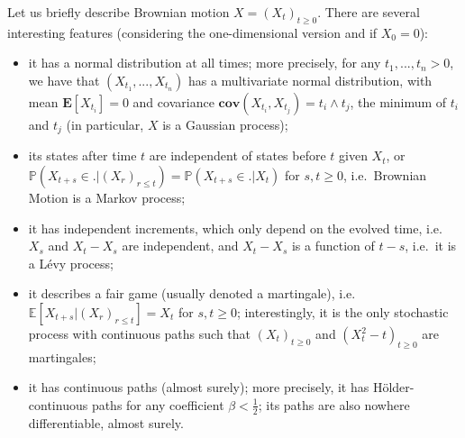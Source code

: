 \documentclass[lean]{Draft}
\begin{document}
Let us briefly describe Brownian motion $X = (X_t)_{t\geq 0}$. There are several interesting features (considering the one-dimensional version and if $X_0=0$):
\begin{itemize}
\item it has a normal distribution at all times; more precisely, for any $t_1,...,t_n > 0$, we have that $(X_{t_1},...,X_{t_n})$ has a multivariate normal distribution, with mean $\mathbf E[X_{t_i}] = 0$ and covariance $\mathbf{cov}(X_{t_i}, X_{t_j}) = t_i \wedge t_j$, the minimum of $t_i$ and $t_j$ (in particular, $X$ is a Gaussian process);
\item its states after time $t$ are independent of states before $t$ given $X_t$, or $\mathbb P(X_{t+s} \in . | (X_r)_{r\leq t}) = \mathbb P(X_{t+s} \in . | X_t)$ for $s,t \ge 0$, i.e.\ Brownian Motion is a Markov process;
\item it has independent increments, which only depend on the evolved time, i.e.\ $X_s$ and $X_t - X_s$ are independent, and $X_t - X_s$ is a function of $t-s$, i.e.\ it is a Lévy process;
\item it describes a fair game (usually denoted a martingale), i.e.\ $\mathbb E[X_{t+s} | (X_r)_{r\leq t}] = X_t$ for $s,t \geq 0$; interestingly, it is the only stochastic process with continuous paths such that $(X_t)_{t\geq 0}$ and $(X_t^2 - t)_{t\geq 0}$ are martingales;
\item it has continuous paths (almost surely); more precisely, it has Hölder-continuous paths for any coefficient $\beta < \tfrac 12$; its paths are also nowhere differentiable, almost surely.
\end{itemize}
\end{document}
